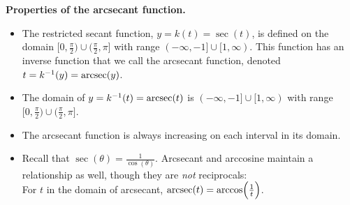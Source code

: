 \documentclass{ximera}
\begin{document}
\begin{callout}{\bf Properties of the arcsecant function.}%
\begin{itemize}
\item
The restricted secant function, $y = k(t) = \sec(t)$, is defined on the domain $\Big[0,\frac{\pi}{2}\Big) \cup \Big(\frac{\pi}{2},\pi \Big]$ with range $(-\infty, -1] \cup [1,\infty)$.  This function has an inverse function that we call the arcsecant function, denoted $t = k^{-1}(y) = \operatorname{arcsec}(y)$.
%
\item
The domain of $y = k^{-1}(t) = \operatorname{arcsec}(t)$ is $(-\infty, -1] \cup [1,\infty)$ with range $\Big[0,\frac{\pi}{2}\Big) \cup \Big(\frac{\pi}{2},\pi \Big]$.
%
\item
The arcsecant function is always increasing on each interval in its domain.
%
\item Recall that $\sec(\theta) = \frac{1}{\cos(\theta)}$. Arcsecant and arccosine maintain a relationship as well, though they are {\it not} reciprocals: \\
For $t$ in the domain of arcsecant, $\operatorname{arcsec}(t) = \arccos\!\Big(\frac{1}{t}\Big)$.
%
%
% 
%
%
%
%
%
%

\end{itemize}
\end{callout}
\end{document}

